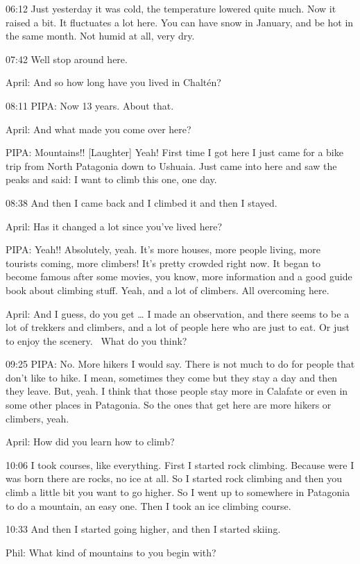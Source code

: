06:12 Just yesterday it was cold, the temperature lowered quite much.
Now it raised a bit. It fluctuates a lot here. You can have snow in
January, and be hot in the same month. Not humid at all, very dry.

07:42 Well stop around here.

April: And so how long have you lived in Chaltén?

08:11 PIPA: Now 13 years. About that.

April: And what made you come over here?

PIPA: Mountains!! {[}Laughter{]} Yeah! First time I got here I just came
for a bike trip from North Patagonia down to Ushuaia. Just came into
here and saw the peaks and said: I want to climb this one, one day.

08:38 And then I came back and I climbed it and then I stayed.

April: Has it changed a lot since you've lived here?

PIPA: Yeah!! Absolutely, yeah. It's more houses, more people living,
more tourists coming, more climbers! It's pretty crowded right now. It
began to become famous after some movies, you know, more information and
a good guide book about climbing stuff. Yeah, and a lot of climbers. All
overcoming here.~

April: And I guess, do you get \ldots{} I made an observation, and there
seems to be a lot of trekkers and climbers, and a lot of people here who
are just to eat. Or just to enjoy the scenery.~ What do you think?

09:25 PIPA: No. More hikers I would say. There is not much to do for
people that don't like to hike. I mean, sometimes they come but they
stay a day and then they leave. But, yeah. I think that those people
stay more in Calafate or even in some other places in Patagonia. So the
ones that get here are more hikers or climbers, yeah.

April: How did you learn how to climb?

10:06 I took courses, like everything. First I started rock climbing.
Because were I was born there are rocks, no ice at all. So I started
rock climbing and then you climb a little bit you want to go higher. So
I went up to somewhere in Patagonia to do a mountain, an easy one. Then
I took an ice climbing course.

10:33 And then I started going higher, and then I started skiing.

Phil: What kind of mountains to you begin with?

